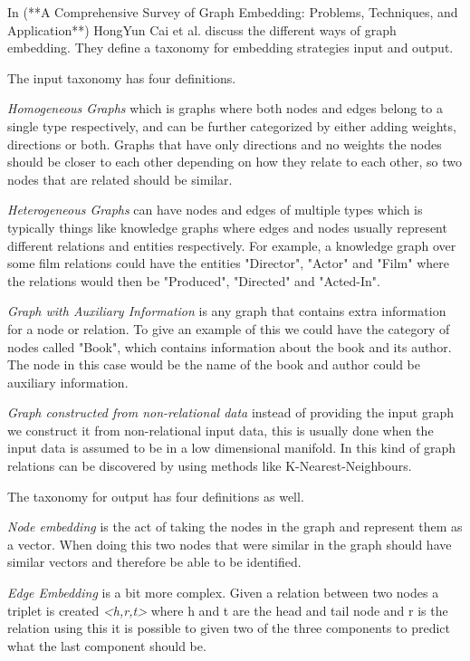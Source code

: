 In (**A Comprehensive Survey of Graph Embedding: Problems, Techniques, and Application**) HongYun Cai et al. discuss the different ways of graph embedding. They define a taxonomy for embedding strategies input and output.

The input taxonomy has four definitions.  

\textit{Homogeneous Graphs} which is graphs where both nodes and edges belong to a single type respectively, and can be further categorized by either adding weights, directions or both. Graphs that have only directions and no weights the nodes should be closer to each other depending on how they relate to each other, so two nodes that are related should be similar.

\textit{Heterogeneous Graphs} can have nodes and edges of multiple types which is typically things like knowledge graphs where edges and nodes usually represent different relations and entities respectively. For example, a knowledge graph over some film relations could have the entities "Director", "Actor" and "Film" where the relations would then be "Produced", "Directed" and "Acted-In".

\textit{Graph with Auxiliary Information} is any graph that contains extra information for a node or relation. To give an example of this we could have the category of nodes called "Book", which contains information about the book and its author. The node in this case would be the name of the book and author could be auxiliary information.

\textit{Graph constructed from non-relational data} instead of providing the input graph we construct it from non-relational input data, this is usually done when the input data is assumed to be in a low dimensional manifold. In this kind of graph relations can be discovered by using methods like K-Nearest-Neighbours.

The taxonomy for output has four definitions as well.

\textit{Node embedding} is the act of taking the nodes in the graph and represent them as a vector. When doing this two nodes that were similar in the graph should have similar vectors and therefore be able to be identified.

\textit{Edge Embedding} is a bit more complex. Given a relation between two nodes a triplet is created \textit{<h,r,t>}  where h and t are the head and tail node and r is the relation using this it is possible to given two of the three components to predict what the last component should be.

